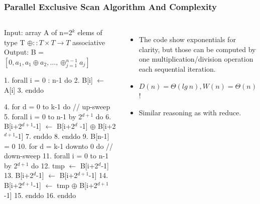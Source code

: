 \documentclass{beamer}
\renewcommand{\emph}[1]{\textcolor{structure}{#1}}
\newcommand{\emp}[1]{\textcolor{DikuRed}{ #1}}
\newcommand{\mymath}[1]{$ #1 $}
\newcommand{\myindx}[1]{_{#1}}
\newcommand{\myindu}[1]{^{#1}}
\begin{document}
\begin{frame}[fragile,t]
  \frametitle{Parallel Exclusive Scan Algorithm And Complexity}
\bigskip

\begin{columns}
\begin{colorcode}[fontsize=\scriptsize]
Input:  array A of n=2\mymath{\myindu{k}} elems of type T
        \mymath{\oplus::T\times T\rightarrow T} associative
Output: B = \mymath{[0, a\myindx{1}, a\myindx{1}\oplus{}a\myindx{2},\ldots,\oplus\myindx{j=1}\myindu{n-1} a\myindx{j}]}

1.  \emph{forall i = 0 : n-1 do}
2.    B[i] \mymath{\leftarrow} A[i]
3.  \emph{enddo}

4.  \emp{for d = 0 to k-1 do} \emph{// up-sweep}
5.    \emph{forall i = 0 to n-1 by 2\mymath{\myindu{d+1}} do} 
6.      B[i+2\mymath{\myindu{d+1}}-1] \mymath{\leftarrow} B[i+2\mymath{\myindu{d}}  -1] \mymath{\oplus} 
                       B[i+2\mymath{\myindu{d+1}}-1]
7.    \emph{enddo}
8.  \emp{enddo}
9.  B[n-1] = 0
10. \emp{for d = k-1 downto 0 do} \emph{// down-sweep}
11.   \emph{forall i = 0 to n-1 by 2\mymath{\myindu{d+1}} do} 
12.     tmp \mymath{\leftarrow} B[i+2\mymath{\myindu{d}}-1]
13.     B[i+2\mymath{\myindu{d}}-1] \mymath{\leftarrow} B[i+2\mymath{\myindu{d+1}}-1]
14.     B[i+2\mymath{\myindu{d+1}}-1] \mymath{\leftarrow} tmp \mymath{\oplus} B[i+2\mymath{\myindu{d+1}}-1]
15.   \emph{enddo}
16. \emp{enddo}
\end{colorcode}
\begin{itemize} 
    \item The code show exponentials for clarity, but those can
            be computed by one multiplication/division operation
            each sequential iteration.
    \item \emp{$D(n) = \Theta(lg \ n), W(n) = \Theta(n)$!}
    \item Similar reasoning as with reduce.
\end{itemize}
\end{columns}

%


\end{frame}
\end{document}
